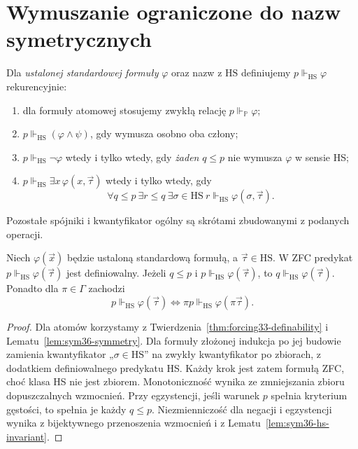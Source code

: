 \section{Wymuszanie ograniczone do nazw symetrycznych}

\begin{definicja}
\label{def:sym36-relative-forcing}
Dla \emph{ustalonej standardowej formuły}
$\varphi$ oraz nazw z $\mathrm{HS}$
definiujemy $p\Vdash_{\mathrm{HS}}\varphi$
rekurencyjnie:
\begin{enumerate}
\item dla formuły atomowej stosujemy zwykłą
relację $p\Vdash_{\mathbb P}\varphi$;
\item $p\Vdash_{\mathrm{HS}}(\varphi\land\psi)$,
gdy wymusza osobno oba człony;
\item $p\Vdash_{\mathrm{HS}}\neg\varphi$
wtedy i tylko wtedy, gdy
\emph{żaden} $q\le p$ nie wymusza
$\varphi$ w sensie HS;
\item $p\Vdash_{\mathrm{HS}}\exists x\,\varphi(x,\vec\tau)$
wtedy i tylko wtedy, gdy
\[
 \forall q\le p\ \exists r\le q\
 \exists\sigma\in\mathrm{HS}\
 r\Vdash_{\mathrm{HS}}\varphi(\sigma,\vec\tau).
\]
\end{enumerate}
Pozostałe spójniki i kwantyfikator ogólny
są skrótami zbudowanymi z podanych operacji.
\end{definicja}

\begin{lemat}
\label{lem:sym36-relative-properties}
Niech $\varphi(\vec x)$ będzie ustaloną
standardową formułą, a $\vec\tau\in\mathrm{HS}$.
W ZFC predykat
$p\Vdash_{\mathrm{HS}}\varphi(\vec\tau)$
jest definiowalny. Jeżeli $q\le p$ i
$p\Vdash_{\mathrm{HS}}\varphi(\vec\tau)$,
to $q\Vdash_{\mathrm{HS}}\varphi(\vec\tau)$.
Ponadto dla $\pi\in\Gamma$ zachodzi
\[
 p\Vdash_{\mathrm{HS}}\varphi(\vec\tau)
 \iff
 \pi p\Vdash_{\mathrm{HS}}\varphi(\pi\vec\tau).
\]
\end{lemat}
\begin{proof}
Dla atomów korzystamy z
Twierdzenia~\ref{thm:forcing33-definability}
i Lematu~\ref{lem:sym36-symmetry}.
Dla formuły złożonej indukcja po jej budowie
zamienia kwantyfikator „$\sigma\in\mathrm{HS}$”
na zwykły kwantyfikator po zbiorach,
z dodatkiem definiowalnego predykatu HS.
Każdy krok jest zatem formułą ZFC,
choć klasa HS nie jest zbiorem.
Monotoniczność wynika ze zmniejszania
zbioru dopuszczalnych wzmocnień.
Przy egzystencji, jeśli warunek $p$
spełnia kryterium gęstości,
to spełnia je każdy $q\le p$.
Niezmienniczość dla negacji i egzystencji
wynika z bijektywnego przenoszenia
wzmocnień i z Lematu~\ref{lem:sym36-hs-invariant}.
\end{proof}


